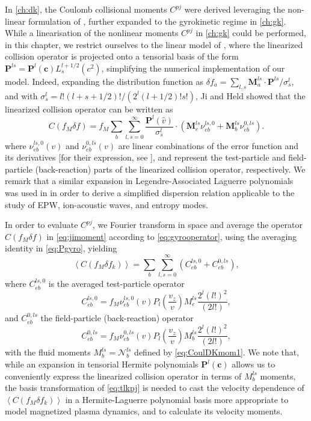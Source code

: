 In \cref{ch:dk}, the Coulomb collisional moments $C^{pj}$ were derived leveraging the non-linear formulation of \citet{Ji2009}, further expanded to the gyrokinetic regime in \cref{ch:gk}.
%
While a linearisation of the nonlinear moments $C^{pj}$ in \cref{ch:gk} could be performed, in this chapter, we restrict ourselves to the linear model of \citet{Ji2006}, where the linearized collision operator is projected onto a tensorial basis of the form $\mathbf P^{ls}=\mathbf P^{l}(\mathbf c)L_s^{l+1/2}(c^2)$, simplifying the numerical implementation of our model.
%
Indeed, expanding the distribution function as $\delta f_a=\sum_{l,s}\mathbf M_a^{ls} \cdot \mathbf P^{ls}/\sigma_s^l$, and with $\sigma_s^l=l!(l+s+1/2)!/(2^l(l+1/2)!s!)$, Ji and Held showed that the {linearized} collision operator can be written as
%
\begin{equation}
    C(f_M \delta f)=f_M \sum_b \sum_{l,s=0}^\infty\frac{\mathbf P^{l}(\hat v)}{\sigma_{s}^l}\cdot \left(\mathbf M_e^{ls} \nu_{eb}^{ls,0}+\mathbf M_b^{ls} \nu_{eb}^{0,ls}\right).
    \label{eq:jimoment}
\end{equation}
%
where $\nu_{eb}^{ls,0}(v)$ and $\nu_{eb}^{0,ls}(v)$ are linear combinations of the error function and its derivatives [for their expression, see \citet{Ji2006}]{, and represent the test-particle and field-particle (back-reaction) parts of the linearized collision operator, respectively}.
%
We remark that a similar expansion in Legendre-Associated Laguerre polynomials was used in \citet{Brantov2012} in order to derive a simplified dispersion relation applicable to the study of EPW, ion-acoustic waves, and entropy modes.

In order to evaluate $C^{pj}$, we Fourier transform in space and average the operator $C(f_M \delta f)$ in \cref{eq:jimoment} according to \cref{eq:gyrooperator}, using the averaging identity in \cref{eq:Pgyro}, yielding
%
\begin{equation}
    \left<C(f_M \delta f_k)\right> = \sum_{b}\sum_{l,s=0}^{\infty}(C_{eb}^{ls,0} + C_{eb}^{0,ls}),
\label{eq:jiheldfmf1}
\end{equation}
%
where $C_{eb}^{ls,0}$ is the averaged test-particle operator
%
\begin{equation}
    C_{eb}^{ls,0} = f_{M} \nu_{eb}^{ls,0}(v) P_l\left(\frac{v_z}{v}\right) M_e^{ls} \frac{2^l (l!)^2}{(2l!)},
\label{eq:jiheldtestp}
\end{equation}
%
and $C_{eb}^{0,ls}$ the field-particle {(back-reaction)} operator
%
\begin{equation}
    C_{eb}^{0,ls} = f_{M} \nu_{eb}^{0,ls}(v) P_l\left(\frac{v_z}{v}\right) M_b^{ls} \frac{2^l (l!)^2}{(2l!)},
\label{eq:jiheldfieldp}
\end{equation}
%
with the fluid moments $M_b^{ls}=\mathcal{N}_b^{ls}$ defined by \cref{eq:CoulDKmom1}.
%
{We note that, while an expansion in tensorial Hermite polynomials $\mathbf P^{l}(\mathbf c)$ allows us to conveniently express the linearized collision operator in terms of $M_b^{ls}$ moments, the basis transformation of \cref{eq:tlkpj} is needed to cast the velocity dependence of $\left< C(f_M \delta f_k)\right>$ in a Hermite-Laguerre polynomial basis more appropriate to model magnetized plasma dynamics, and to calculate its velocity moments.}

